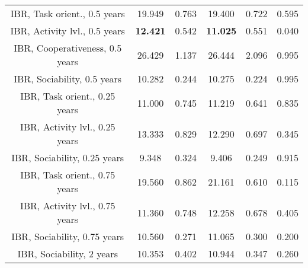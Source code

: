 \begin{longtable}{c c c c c c}
IBR, Task orient., 0.5 years & 19.949 & 0.763 &  19.400 & 0.722 & 0.595 \\
IBR, Activity lvl., 0.5 years & \textbf{12.421} & 0.542 &  \textbf{11.025} & 0.551 & 0.040 \\
IBR, Cooperativeness, 0.5 years & 26.429 & 1.137 &  26.444 & 2.096 & 0.995 \\
IBR, Sociability, 0.5 years & 10.282 & 0.244 &  10.275 & 0.224 & 0.995 \\
IBR, Task orient., 0.25 years & 11.000 & 0.745 &  11.219 & 0.641 & 0.835 \\
IBR, Activity lvl., 0.25 years & 13.333 & 0.829 &  12.290 & 0.697 & 0.345 \\
IBR, Sociability, 0.25 years & 9.348 & 0.324 &  9.406 & 0.249 & 0.915 \\
IBR, Task orient., 0.75 years & 19.560 & 0.862 &  21.161 & 0.610 & 0.115 \\
IBR, Activity lvl., 0.75 years & 11.360 & 0.748 &  12.258 & 0.678 & 0.405 \\
IBR, Sociability, 0.75 years & 10.560 & 0.271 &  11.065 & 0.300 & 0.200 \\
IBR, Sociability, 2 years & 10.353 & 0.402 &  10.944 & 0.347 & 0.260 \\
\bottomrule
\end{longtable}
